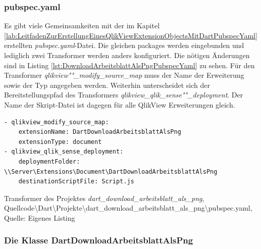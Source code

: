 \subsubsection{pubspec.yaml}

Es gibt viele Gemeinsam\-keiten mit der im Kapitel \ref{lab:LeitfadenZurErstellungEinesQlikViewExtensionObjectsMitDartPubspecYaml} erstellten \textit{pubspec.yaml}-Datei. Die gleichen packages werden eingebunden und lediglich zwei Transformer werden anders konfiguriert. Die nötigen Änderungen sind in Listing \ref{lst:DownloadArbeitsblattAlsPngPubspecYaml} zu sehen. Für den Transformer \textit{qlikview""\_modify\_source\_map} muss der Name der Erweiterung sowie der Typ angegeben werden. Weiterhin unterscheidet sich der Bereitstellungspfad des Transformers \textit{qlikview\_qlik\_sense""\_deployment}. Der Name der Skript-Datei ist dagegen für alle QlikView Erweiterungen gleich.

\ifIncludeFigures\begin{listing}[htbp]
\begin{verbatim}
- qlikview_modify_source_map:
    extensionName: DartDownloadArbeitsblattAlsPng
    extensionType: document
- qlikview_qlik_sense_deployment:
    deploymentFolder: \\Server\Extensions\Document\DartDownloadArbeitsblattAlsPng
    destinationScriptFile: Script.js
\end{verbatim}
\caption[Transformer des Projektes \textit{dart\_download\_arbeitsblatt\_als\_png}]{Transformer des Projektes \textit{dart\_download\_arbeitsblatt\_als\_png}, \\Quellcode\textbackslash{}Dart\textbackslash{}Projekte\textbackslash{}dart\_download\_arbeitsblatt\_als\_png\textbackslash{}pubspec.yaml, \\Quelle: Eigenes Listing}
\label{lst:DownloadArbeitsblattAlsPngPubspecYaml}
\end{listing}\fi

\subsubsection{Die Klasse DartDownloadArbeitsblattAlsPng}

